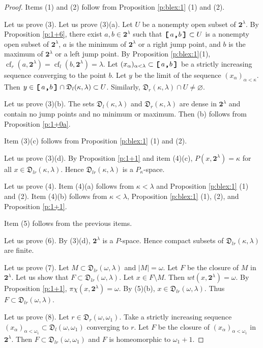\documentclass[preprint]{elsarticle}
\def\om{\omega}
\def\al{\alpha}
\def\la{\lambda}
\def\ka{\kappa}
\def\es{\varnothing}
\theoremstyle{definition}
\theoremstyle{remark}
\def\cf{\operatorname{cf}}
\def\lex#1#2{\mathfrak{L}(#2^{#1})}
\def\lex#1#2{#2^{#1}}
\def\homg#1,#2#3{\mathfrak{D}_{#1}(#2,#3)}
\def\B{2}
\def\B{\mathsf{2}}
\def\B{\mathbf{2}}
\def\ilcomma/{\boldsymbol{,}}
\def\ilsymlc{\boldsymbol{[}}
\def\ilsymrc{\boldsymbol{]}}
\def\ilfont#1{\boldsymbol{#1}}
\def\ilfontX#1{\mathrm{\text{\texttt{\textbf{\large #1}}}}}
\def\ilfontX#1{{\text{\texttt{\textbf{\large \upshape #1}}}}}
\def\ilfont#1{\raisebox{-1.2pt}{\ilfontX{#1}}}
\def\ilfontC#1{\raisebox{-0.7pt}{\ilfontX{#1}}}
\def\ilcomma/{\ilfontC{,}}
\def\ilsymlc{\ilfont{[}\,}
\def\ilsymrc{\,\ilfont{]}}
\def\ilcc[#1,#2]{\ilsymlc#1\ilcomma/ #2\ilsymrc}
\def\sq#1#2{(#1)_{#2}}
\def\lexab{\lex\la\B}
\begin{document}
\begin{proof}
Items (1) and (2) follow from Proposition \ref{p:blex:1} (1) and (2).


Let us prove (3). Let us prove (3)(a). Let $U$ be a nonempty open subset of $\lexab$. By Proposition \ref{p:1+6}, there exist $a,b\in \lexab$ such that $\ilcc[a,b]\subset U$ is a nonempty open subset of $\lexab$, $a$ is the minimum of $\lexab$ or a right jump point, and $b$ is the maximum of $\lexab$ or a left jump point. By Proposition \ref{p:blex:1}(1), $\cf_r(a,\lexab)=\cf_l(b,\lexab)=\la$. Let $\sq{x_\al}{\al<\la}\subset \ilcc[a,b]$ be a strictly increasing sequence converging to the point $b$. Let $y$ be the limit of the sequence $\sq{x_\al}{\al<\ka}$. Then $y\in \ilcc[a,b] \cap \homg l,\ka\la\subset U$. Similarly, $\homg r,\ka\la\cap U\neq\es$.

Let us prove (3)(b). The sets $\homg l,\ka\la$ and $\homg r,\ka\la$ are dense in $\lexab$ and contain no jump points and no minimum or maximum. Then (b) follows from Proposition \ref{p:1+0a}.

Item (3)(c) follows from Proposition \ref{p:blex:1} (1) and (2).

Let us prove (3)(d). By Proposition \ref{p:1+1} and item (4)(c), $P(x,\lexab)=\ka$ for all $x\in \homg lr,\ka\la$. Hence $\homg lr,\ka\la$ is a $P_\ka$-space.


Let us prove (4). Item (4)(a) follows from $\ka<\la$ and Proposition \ref{p:blex:1} (1) and (2).
Item (4)(b) follows from $\ka<\la$, Proposition \ref{p:blex:1} (1), (2), and Proposition \ref{p:1+1}.

Item (5) follows from the previous items.

Let us prove (6). By (3)(d), $\lexab$ is a $P$-space. Hence compact subsets of $\homg lr,\ka\la$ are finite.

Let us prove (7). Let $M\subset \homg lr,\om\la$ and $|M|=\om$. Let $F$ be the closure of $M$ in $\lexab$. Let us show that $F\subset \homg lr,\om\la$. Let $x\in F\setminus M$. Then $wt(x,\lexab)=\om$. By Proposition \ref{p:1+1}, $\pi\chi(x,\lexab)=\om$. By (5)(b), $x\in \homg lr,\om\la$. Thus $F\subset \homg lr,\om\la$.

Let us prove (8). Let $r\in \homg r,\om{\om_1}$. Take a strictly increasing sequence $\sq{x_\al}{\al<\om_1}\subset \homg l,\om{\om_1}$ converging to $r$. Let $F$ be the closure of $\sq{x_\al}{\al<\om_1}$ in $\lexab$. Then $F\subset \homg lr,\om{\om_1}$ and $F$ is homeomorphic to $\om_1+1$.
\end{proof}
\end{document}

